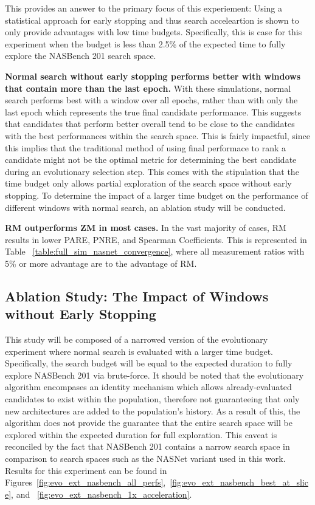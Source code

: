\documentclass[twocolumn]{article}
\begin{document}
This provides an answer to the primary focus of this experiement: Using a statistical approach for early stopping and thus search acceleartion
is shown to only provide advantages with low time budgets.
Specifically, this is case for this experiment when the budget is less than 2.5\% of the expected time to fully explore the NASBench 201 search space.

\textbf{Normal search without early stopping performs better with windows that contain more than the last epoch.}
With these simulations, normal search performs best with a window over all epochs, rather than with only the last epoch which represents the true final candidate performance.
This suggests that candidates that perform better overall tend to be close to the candidates with the best performances within the search space.
This is fairly impactful, since this implies that the traditional method of using final performace to rank a candidate might not be the optimal
metric for determining the best candidate during an evolutionary selection step.
This comes with the stipulation that the time budget only allows partial exploration of the search space without early stopping.
To determine the impact of a larger time budget on the performance of different windows with normal search, an ablation study will be conducted.

\textbf{RM outperforms ZM in most cases.}
In the vast majority of cases, RM results in lower PARE, PNRE, and Spearman Coefficients.
This is represented in Table ~\ref{table:full_sim_nasnet_convergence}, where all measurement ratios with 5\% or more advantage are to the advantage of RM.

\subsection{Ablation Study: The Impact of Windows without Early Stopping}

This study will be composed of a narrowed version of the evolutionary experiment where normal search is evaluated with a larger time budget.
Specifically, the search budget will be equal to the expected duration to fully explore NASBench 201 via brute-force. 
It should be noted that the evolutionary algorithm encompases an identity mechanism which allows already-evaluated candidates to exist within the population,
therefore not guaranteeing that only new architectures are added to the population's history.
As a result of this, the algorithm does not provide the guarantee that the entire search space will be explored within the expected duration for full exploration.
This caveat is reconciled by the fact that NASBench 201 contains a narrow search space in comparison to search spaces such as the NASNet variant used in this work.
Results for this experiment can be found in Figures~\ref{fig:evo_ext_nasbench_all_perfs},~\ref{fig:evo_ext_nasbench_best_at_slice}, and ~\ref{fig:evo_ext_nasbench_1x_acceleration}.
\end{document}
